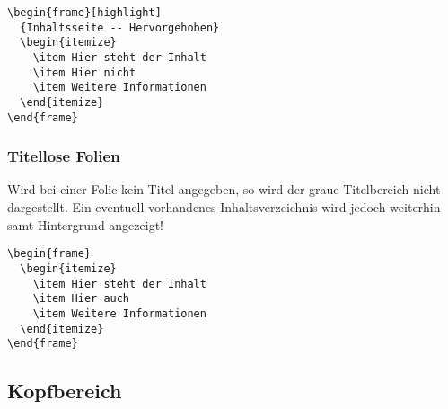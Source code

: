 \begin{minipage}{0.5\textwidth}
\begin{verbatim}
\begin{frame}[highlight]
  {Inhaltsseite -- Hervorgehoben}
  \begin{itemize}
    \item Hier steht der Inhalt
    \item Hier nicht
    \item Weitere Informationen
  \end{itemize}
\end{frame}
\end{verbatim}
\end{minipage}
\begin{minipage}{0.5\textwidth}
\end{minipage}

\subsubsection{Titellose Folien}

Wird bei einer Folie kein Titel angegeben, so wird der graue Titelbereich
nicht dargestellt.
Ein eventuell vorhandenes Inhaltsverzeichnis wird jedoch weiterhin samt
Hintergrund angezeigt!

\begin{minipage}{0.5\textwidth}
\begin{verbatim}
\begin{frame}
  \begin{itemize}
    \item Hier steht der Inhalt
    \item Hier auch
    \item Weitere Informationen
  \end{itemize}
\end{frame}
\end{verbatim}
\end{minipage}
\begin{minipage}{0.5\textwidth}
\end{minipage}

\subsection{Kopfbereich}\label{subsec:head}

